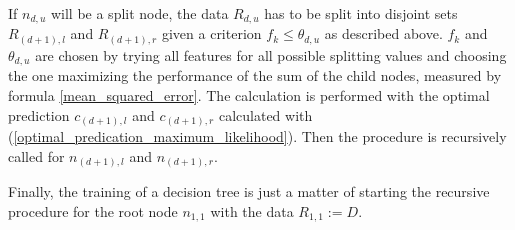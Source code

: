     If $n_{d,u}$ will be a split node, the data $R_{d,u}$ has to be split into disjoint sets $R_{(d+1),l}$ and $R_{(d+1),r}$ given a criterion $f_k \leq \theta_{d,u}$ as described above. $f_k$ and $\theta_{d,u}$ are chosen by trying all features for all possible splitting values and choosing the one maximizing the performance of the sum of the child nodes, measured by formula \ref{mean_squared_error}. The calculation is performed with the optimal prediction $c_{(d+1),l}$ and $c_{(d+1),r}$ calculated with (\ref{optimal_predication_maximum_likelihood}). Then the procedure is recursively called for $n_{(d+1),l}$ and $n_{(d+1),r}$.
    
    Finally, the training of a decision tree is just a matter of starting the recursive procedure for the root node $n_{1,1}$ with the data $R_{1,1} := D$.
    

